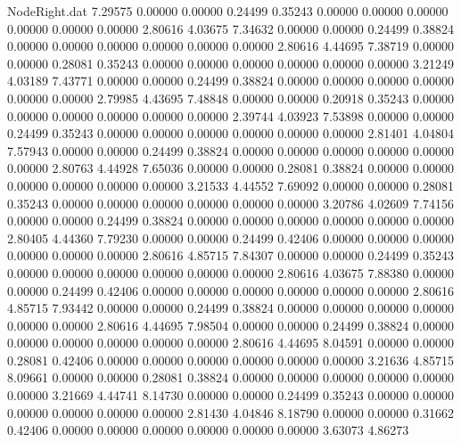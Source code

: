 \begin{filecontents}{NodeRight.dat}
   7.29575    0.00000    0.00000     0.24499    0.35243    0.00000    0.00000    0.00000    0.00000    0.00000    0.00000    2.80616    4.03675
   7.34632    0.00000    0.00000     0.24499    0.38824    0.00000    0.00000    0.00000    0.00000    0.00000    0.00000    2.80616    4.44695
   7.38719    0.00000    0.00000     0.28081    0.35243    0.00000    0.00000    0.00000    0.00000    0.00000    0.00000    3.21249    4.03189
   7.43771    0.00000    0.00000     0.24499    0.38824    0.00000    0.00000    0.00000    0.00000    0.00000    0.00000    2.79985    4.43695
   7.48848    0.00000    0.00000     0.20918    0.35243    0.00000    0.00000    0.00000    0.00000    0.00000    0.00000    2.39744    4.03923
   7.53898    0.00000    0.00000     0.24499    0.35243    0.00000    0.00000    0.00000    0.00000    0.00000    0.00000    2.81401    4.04804
   7.57943    0.00000    0.00000     0.24499    0.38824    0.00000    0.00000    0.00000    0.00000    0.00000    0.00000    2.80763    4.44928
   7.65036    0.00000    0.00000     0.28081    0.38824    0.00000    0.00000    0.00000    0.00000    0.00000    0.00000    3.21533    4.44552
   7.69092    0.00000    0.00000     0.28081    0.35243    0.00000    0.00000    0.00000    0.00000    0.00000    0.00000    3.20786    4.02609
   7.74156    0.00000    0.00000     0.24499    0.38824    0.00000    0.00000    0.00000    0.00000    0.00000    0.00000    2.80405    4.44360
   7.79230    0.00000    0.00000     0.24499    0.42406    0.00000    0.00000    0.00000    0.00000    0.00000    0.00000    2.80616    4.85715
   7.84307    0.00000    0.00000     0.24499    0.35243    0.00000    0.00000    0.00000    0.00000    0.00000    0.00000    2.80616    4.03675
   7.88380    0.00000    0.00000     0.24499    0.42406    0.00000    0.00000    0.00000    0.00000    0.00000    0.00000    2.80616    4.85715
   7.93442    0.00000    0.00000     0.24499    0.38824    0.00000    0.00000    0.00000    0.00000    0.00000    0.00000    2.80616    4.44695
   7.98504    0.00000    0.00000     0.24499    0.38824    0.00000    0.00000    0.00000    0.00000    0.00000    0.00000    2.80616    4.44695
   8.04591    0.00000    0.00000     0.28081    0.42406    0.00000    0.00000    0.00000    0.00000    0.00000    0.00000    3.21636    4.85715
   8.09661    0.00000    0.00000     0.28081    0.38824    0.00000    0.00000    0.00000    0.00000    0.00000    0.00000    3.21669    4.44741
   8.14730    0.00000    0.00000     0.24499    0.35243    0.00000    0.00000    0.00000    0.00000    0.00000    0.00000    2.81430    4.04846
   8.18790    0.00000    0.00000     0.31662    0.42406    0.00000    0.00000    0.00000    0.00000    0.00000    0.00000    3.63073    4.86273

\end{filecontents}
